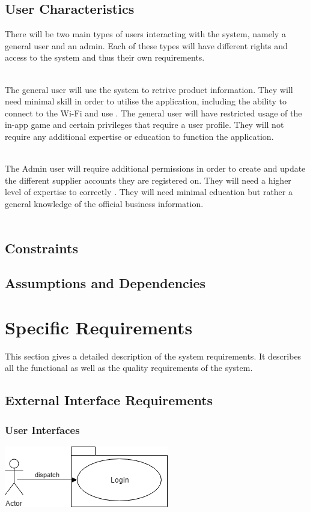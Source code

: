 \documentclass[a4paper,10pt]{article}
\begin{document}
    	\subsection{User Characteristics}  
		{ 

There will be two main types of users interacting with the system, namely a general user and an admin. Each of these types will have different rights and access to the system and thus their own requirements.\\\\}

{The general user will use the system to retrive product information. They will need minimal skill in order to utilise the application, including the ability to connect to the Wi-Fi and use . The general user will have restricted usage of the in-app game and certain privileges that require a user profile. They will not require any additional expertise or education to function the application.\\\\}

{The Admin user will require additional permissions in order to create and update the different supplier accounts they are registered on. They will need a higher level of expertise to correctly . They will need minimal education but rather a general knowledge of the official business information.\\\\} 
    	\subsection{Constraints}   
    	\subsection{Assumptions and Dependencies}

		
	\section{Specific Requirements}
This section gives a detailed description of the system requirements. It describes all the functional as well as the quality requirements of the system.

	\subsection{External Interface Requirements}

                 \subsubsection{User Interfaces}
		 \includegraphics[scale=0.62]{login.png}
\end{document}
